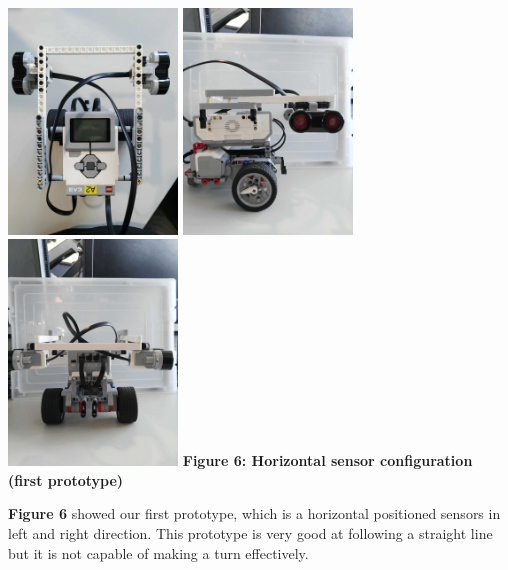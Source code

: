 \documentclass[hidelinks,a4paper,11pt]{article}
\begin{document}
\begin{mdframed}
\begin{center}
\includegraphics[width=4.5cm]{horizontal1.jpg}
\includegraphics[width=4.5cm]{horizontal2.jpg}
\includegraphics[width=4.5cm]{horizontal3.jpg}
\textbf{Figure 6: Horizontal sensor configuration (first prototype)}
\end{center}
\textbf{Figure 6} showed our first prototype, which is a horizontal positioned sensors in left and
right direction. This prototype is very good at following a straight line but it is not capable of
making a turn effectively. \\


\end{mdframed}
\end{document}
